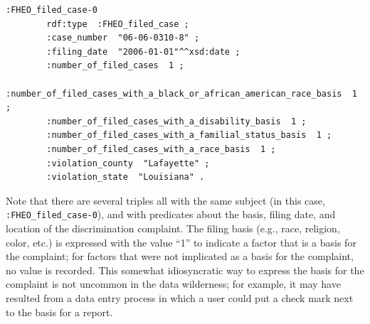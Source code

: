 \begin{lstlisting}
:FHEO_filed_case-0
        rdf:type  :FHEO_filed_case ;
        :case_number  "06-06-0310-8" ;
        :filing_date  "2006-01-01"^^xsd:date ;
        :number_of_filed_cases  1 ;
        :number_of_filed_cases_with_a_black_or_african_american_race_basis  1 ;
        :number_of_filed_cases_with_a_disability_basis  1 ;
        :number_of_filed_cases_with_a_familial_status_basis  1 ;
        :number_of_filed_cases_with_a_race_basis  1 ;
        :violation_county  "Lafayette" ;
        :violation_state  "Louisiana" .
\end{lstlisting}

Note that
there are several triples all with the same subject (in this case,
\texttt{:FHEO\_filed\_case-0}), and with  predicates about the basis, filing date, and
location of the discrimination complaint. The filing basis (e.g., race,
religion, color, etc.) is expressed with the value ``1'' to indicate a
factor that is a basis for the complaint; for factors that were not implicated
as a basis for the complaint, no value is recorded. This somewhat idiosyncratic
way to express the basis for the complaint is not uncommon in the data
wilderness; for example, it may have resulted from a data entry process
in which a user could put a check mark next to the basis for a report.

